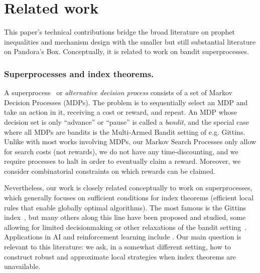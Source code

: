 \section{Related work}
\label{subsec:related}

This paper's technical contributions bridge the broad literature on prophet inequalities and mechanism design with the smaller but still substantial literature on Pandora's Box.
Conceptually, it is related to work on bandit superprocesses.

\subsubsection{Superprocesses and index theorems.}
A superprocess~\cite{nash1973optimal} or \emph{alternative decision process} consists of a set of Markov Decision Processes (MDPs).
The problem is to sequentially select an MDP and take an action in it, receiving a cost or reward, and repeat.
An MDP whose decision set is only ``advance'' or ``pause'' is called a \emph{bandit}, and the special case where all MDPs are bandits is the Multi-Armed Bandit setting of e.g. Gittins.
Unlike with most works involving MDPs, our Markov Search Processes only allow for search costs (not rewards), we do not have any time-discounting, and we require processes to halt in order to eventually claim a reward.
Moreover, we consider combinatorial constraints on which rewards can be claimed.

Nevertheless, our work is closely related conceptually to work on superprocesses, which generally focuses on sufficient conditions for index theorems (efficient local rules that enable globally optimal algorithms).
The most famous is the Gittins index~\citep[e.g.]{gittins1979bandit}, but many others along this line have been proposed and studied, some allowing for limited decisionmaking or other relaxations of the bandit setting~\citep{glazebrook1976profitability,whittle1980multi,nash1980generalized,glazebrook1982sufficient,granot1991optimal,glazebrook1993indices,dumitriu2003playing,keller2003branching}.
Applications in AI and reinforcement learning include \citep{brown2013optimal,hadfield-menell2015multi}.
Our main question is relevant to this literature: we ask, in a somewhat different setting, how to construct robust and approximate local strategies when index theorems are unavailable.

